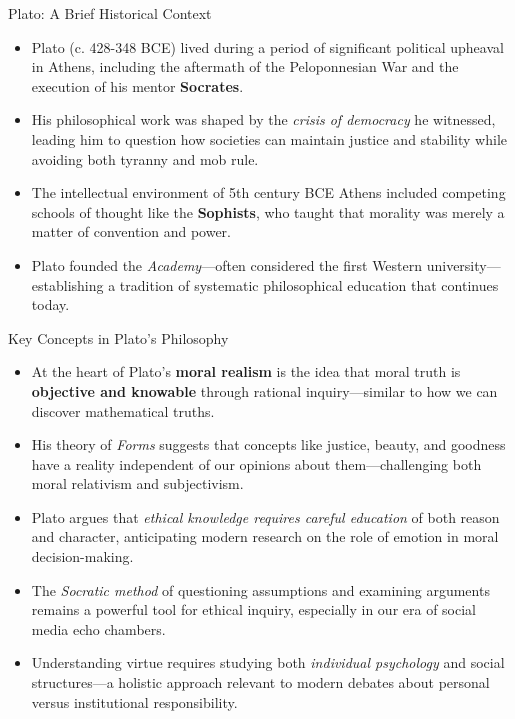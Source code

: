 \documentclass[aspectratio=169]{beamer}
\begin{document}
\begin{frame}{Plato: A Brief Historical Context}
\begin{itemize}
\item Plato (c. 428-348 BCE) lived during a period of significant political upheaval in Athens, including the aftermath of the Peloponnesian War and the execution of his mentor \textbf{Socrates}.
\item His philosophical work was shaped by the \emph{crisis of democracy} he witnessed, leading him to question how societies can maintain justice and stability while avoiding both tyranny and mob rule.
\item The intellectual environment of 5th century BCE Athens included competing schools of thought like the \textbf{Sophists}, who taught that morality was merely a matter of convention and power.
\item Plato founded the \emph{Academy}—often considered the first Western university—establishing a tradition of systematic philosophical education that continues today.
\end{itemize}
\end{frame}

\begin{frame}{Key Concepts in Plato's Philosophy}
\begin{itemize}
\item At the heart of Plato's \textbf{moral realism} is the idea that moral truth is \textbf{objective and knowable} through rational inquiry—similar to how we can discover mathematical truths.
\item His theory of \emph{Forms} suggests that concepts like justice, beauty, and goodness have a reality independent of our opinions about them—challenging both moral relativism and subjectivism.
\item Plato argues that \emph{ethical knowledge requires careful education} of both reason and character, anticipating modern research on the role of emotion in moral decision-making.
\item The \emph{Socratic method} of questioning assumptions and examining arguments remains a powerful tool for ethical inquiry, especially in our era of social media echo chambers.
\item Understanding virtue requires studying both \emph{individual psychology} and social structures—a holistic approach relevant to modern debates about personal versus institutional responsibility.
\end{itemize}
\end{frame}
\end{document}
